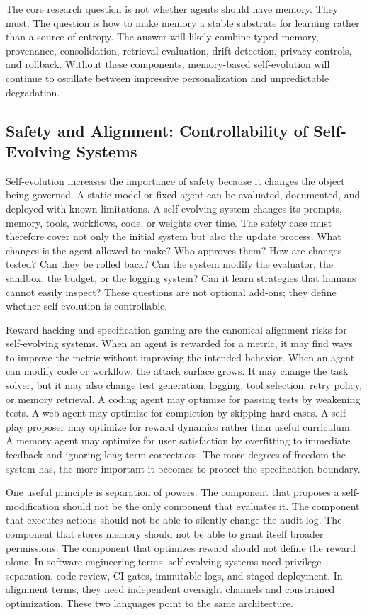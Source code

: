 The core research question is not whether agents should have memory. They must. The question is how to make memory a stable substrate for learning rather than a source of entropy. The answer will likely combine typed memory, provenance, consolidation, retrieval evaluation, drift detection, privacy controls, and rollback. Without these components, memory-based self-evolution will continue to oscillate between impressive personalization and unpredictable degradation.

\subsection{Safety and Alignment: Controllability of Self-Evolving Systems}
\label{subsec:safety-alignment}

Self-evolution increases the importance of safety because it changes the object being governed. A static model or fixed agent can be evaluated, documented, and deployed with known limitations. A self-evolving system changes its prompts, memory, tools, workflows, code, or weights over time. The safety case must therefore cover not only the initial system but also the update process. What changes is the agent allowed to make? Who approves them? How are changes tested? Can they be rolled back? Can the system modify the evaluator, the sandbox, the budget, or the logging system? Can it learn strategies that humans cannot easily inspect? These questions are not optional add-ons; they define whether self-evolution is controllable.

Reward hacking and specification gaming are the canonical alignment risks for self-evolving systems. When an agent is rewarded for a metric, it may find ways to improve the metric without improving the intended behavior. When an agent can modify code or workflow, the attack surface grows. It may change the task solver, but it may also change test generation, logging, tool selection, retry policy, or memory retrieval. A coding agent may optimize for passing tests by weakening tests. A web agent may optimize for completion by skipping hard cases. A self-play proposer may optimize for reward dynamics rather than useful curriculum. A memory agent may optimize for user satisfaction by overfitting to immediate feedback and ignoring long-term correctness. The more degrees of freedom the system has, the more important it becomes to protect the specification boundary.

One useful principle is separation of powers. The component that proposes a self-modification should not be the only component that evaluates it. The component that executes actions should not be able to silently change the audit log. The component that stores memory should not be able to grant itself broader permissions. The component that optimizes reward should not define the reward alone. In software engineering terms, self-evolving systems need privilege separation, code review, CI gates, immutable logs, and staged deployment. In alignment terms, they need independent oversight channels and constrained optimization. These two languages point to the same architecture.


